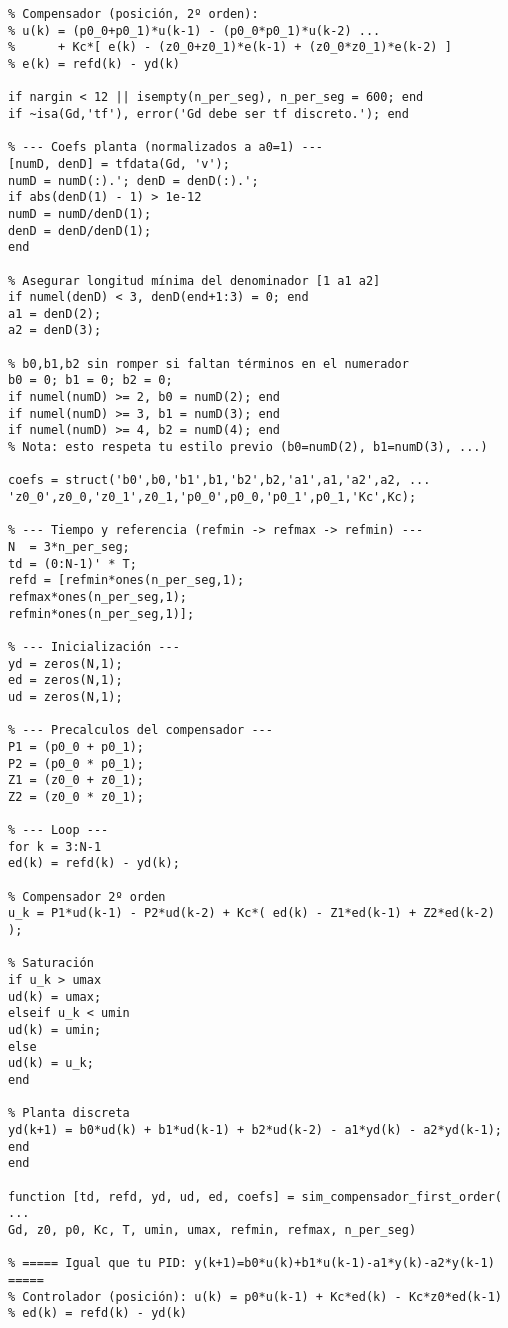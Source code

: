 \begin{lstlisting}[style=matlabstyle,caption={Funciones reutilizadas de laboratorios pasados.},label={matlab:oldfunc}]
% ===== Planta: y(k+1)=b0*u(k)+b1*u(k-1)+b2*u(k-2)-a1*y(k)-a2*y(k-1) =====
% Compensador (posición, 2º orden):
% u(k) = (p0_0+p0_1)*u(k-1) - (p0_0*p0_1)*u(k-2) ...
%      + Kc*[ e(k) - (z0_0+z0_1)*e(k-1) + (z0_0*z0_1)*e(k-2) ]
% e(k) = refd(k) - yd(k)

if nargin < 12 || isempty(n_per_seg), n_per_seg = 600; end
if ~isa(Gd,'tf'), error('Gd debe ser tf discreto.'); end

% --- Coefs planta (normalizados a a0=1) ---
[numD, denD] = tfdata(Gd, 'v');
numD = numD(:).'; denD = denD(:).';
if abs(denD(1) - 1) > 1e-12
numD = numD/denD(1);
denD = denD/denD(1);
end

% Asegurar longitud mínima del denominador [1 a1 a2]
if numel(denD) < 3, denD(end+1:3) = 0; end
a1 = denD(2);
a2 = denD(3);

% b0,b1,b2 sin romper si faltan términos en el numerador
b0 = 0; b1 = 0; b2 = 0;
if numel(numD) >= 2, b0 = numD(2); end
if numel(numD) >= 3, b1 = numD(3); end
if numel(numD) >= 4, b2 = numD(4); end
% Nota: esto respeta tu estilo previo (b0=numD(2), b1=numD(3), ...)

coefs = struct('b0',b0,'b1',b1,'b2',b2,'a1',a1,'a2',a2, ...
'z0_0',z0_0,'z0_1',z0_1,'p0_0',p0_0,'p0_1',p0_1,'Kc',Kc);

% --- Tiempo y referencia (refmin -> refmax -> refmin) ---
N  = 3*n_per_seg;
td = (0:N-1)' * T;
refd = [refmin*ones(n_per_seg,1);
refmax*ones(n_per_seg,1);
refmin*ones(n_per_seg,1)];

% --- Inicialización ---
yd = zeros(N,1);
ed = zeros(N,1);
ud = zeros(N,1);

% --- Precalculos del compensador ---
P1 = (p0_0 + p0_1);
P2 = (p0_0 * p0_1);
Z1 = (z0_0 + z0_1);
Z2 = (z0_0 * z0_1);

% --- Loop ---
for k = 3:N-1
ed(k) = refd(k) - yd(k);

% Compensador 2º orden
u_k = P1*ud(k-1) - P2*ud(k-2) + Kc*( ed(k) - Z1*ed(k-1) + Z2*ed(k-2) );

% Saturación
if u_k > umax
ud(k) = umax;
elseif u_k < umin
ud(k) = umin;
else
ud(k) = u_k;
end

% Planta discreta
yd(k+1) = b0*ud(k) + b1*ud(k-1) + b2*ud(k-2) - a1*yd(k) - a2*yd(k-1);
end
end

function [td, refd, yd, ud, ed, coefs] = sim_compensador_first_order( ...
Gd, z0, p0, Kc, T, umin, umax, refmin, refmax, n_per_seg)

% ===== Igual que tu PID: y(k+1)=b0*u(k)+b1*u(k-1)-a1*y(k)-a2*y(k-1) =====
% Controlador (posición): u(k) = p0*u(k-1) + Kc*ed(k) - Kc*z0*ed(k-1)
% ed(k) = refd(k) - yd(k)


\end{lstlisting}
